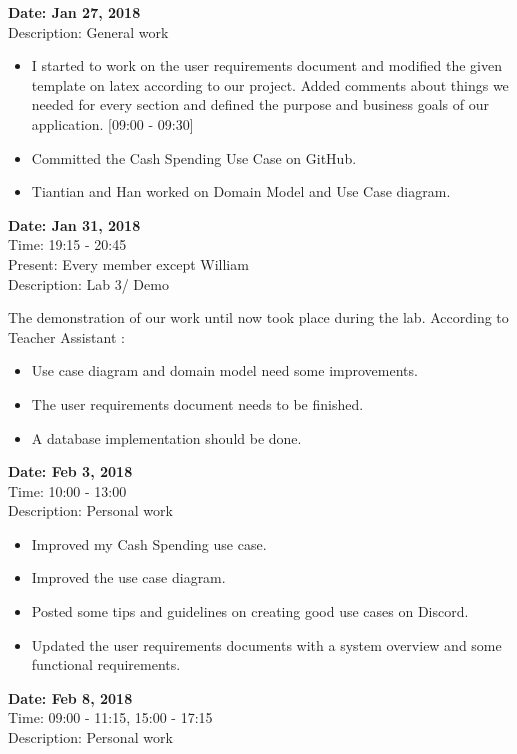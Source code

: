 \documentclass[12pt]{article}
\begin{document}
\begin{flushleft}
\textbf{Date: Jan 27, 2018} \\
Description: General work  \\
\begin{itemize}
\item I started to work on the user requirements document and modified the given template on latex according to our project. Added comments about things we needed for every section and defined the purpose and business goals of our application. [09:00 - 09:30]
\item Committed the Cash Spending Use Case on GitHub. 
\item Tiantian and Han worked on Domain Model and Use Case diagram.
\end{itemize}

\textbf{Date: Jan 31, 2018} \\
Time: 19:15 - 20:45 \\
Present: Every member except William \\
Description: Lab 3/ Demo  
\newline

The demonstration of our work until now took place during the lab. According to Teacher Assistant :
\begin{itemize}
\item Use case diagram and domain model need some improvements. 
\item The user requirements document needs to be finished.
\item A database implementation should be done. 
\end{itemize}

\textbf{Date: Feb 3, 2018} \\
Time: 10:00 - 13:00 \\
Description: Personal work  \\
\begin{itemize}
\item Improved my Cash Spending use case.
\item Improved the use case diagram.
\item Posted some tips and guidelines on creating good use cases on Discord.
\item Updated the user requirements documents with a system overview and some functional requirements. 
\end{itemize}


\textbf{Date: Feb 8, 2018} \\
Time: 09:00 - 11:15, 15:00 - 17:15 \\
Description: Personal work  \\
\begin{itemize}


\end{itemize}
\end{flushleft}
\end{document}
